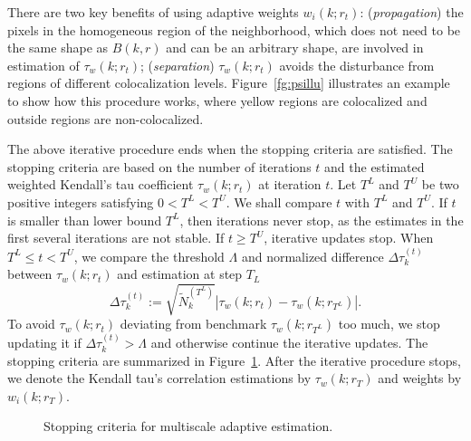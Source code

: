 \documentclass[10pt,twocolumn,twoside]{IEEEtran}
\begin{document}
There are two key benefits of using adaptive weights $w_i(k;r_t)$: ({\it propagation}) the pixels in the homogeneous region of the neighborhood, which does not need to be the same shape as $B(k,r)$ and can be an arbitrary shape, are involved in estimation of $\tau_w(k;r_t)$; ({\it separation}) $\tau_w(k;r_t)$ avoids the disturbance from regions of different colocalization levels. Figure~\ref{fg:psillu} illustrates an example to show how this procedure works, where yellow regions are colocalized and outside regions are non-colocalized.  

The above iterative procedure ends when the stopping criteria are satisfied. The stopping criteria are based on the number of iterations $t$ and the estimated weighted Kendall's tau coefficient $\tau_w(k;r_t)$ at iteration $t$. Let $T^L$ and $T^U$ be two positive integers satisfying $0<T^L<T^U$. We shall compare $t$ with $T^L$ and $T^U$. If $t$ is smaller than lower bound $T^L$, then iterations never stop, as the estimates in the first several iterations are not stable. If $t\ge T^U$, iterative updates stop. When $T^L\le t<T^U$, we compare the threshold $\Lambda$ and normalized difference $\Delta \tau_k^{(t)}$ between $\tau_w(k;r_t)$ and estimation at step $T_L$ 
$$
\Delta \tau_k^{(t)}:=\sqrt{\tilde{N}_k^{(T^L)}}|\tau_w(k;r_t)-\tau_w(k;r_{T^L})|.
$$ 
To avoid $\tau_w(k;r_t)$ deviating from benchmark $\tau_w(k;r_{T^L})$ too much, we stop updating it if $\Delta \tau_k^{(t)}>\Lambda$ and otherwise continue the iterative updates. The stopping criteria are summarized in Figure~\ref{fg:stopct}. After the iterative procedure stops, we denote the Kendall tau's correlation estimations by $\tau_w(k;r_T)$ and weights by $w_i(k;r_T)$.

\begin{figure}[h!]
\begin{center}
\caption{Stopping criteria for multiscale adaptive estimation.}
\label{fg:stopct}
\end{center}
\end{figure}
\end{document}
